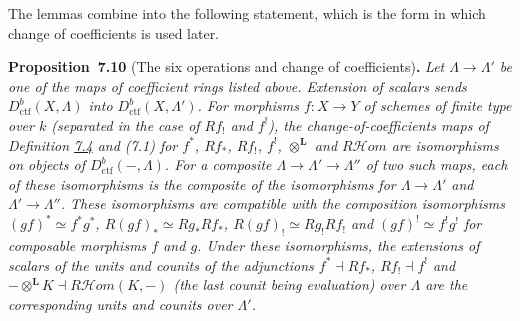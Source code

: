 \documentclass[11pt]{article}
\newenvironment{bpstatement}[2]{\par\addvspace{0.6\baselineskip}\noindent\textbf{#1}#2\textbf{.}\enspace\ignorespaces}
  {\par\addvspace{0.4\baselineskip}}
\newenvironment{bpstatementit}[2]{\begin{bpstatement}{#1}{#2}\itshape\ignorespaces}{\end{bpstatement}}
\providecommand{\cHom}{}\renewcommand{\cHom}{R\mathcal{H}\!om}
\begin{document}
\label{bp625}%
The lemmas combine into the following statement, which is the form in which change of coefficients is used later.

\label{bp626}%
\begin{bpstatementit}{Proposition~7.10}{ (The six operations and change of coefficients)}
Let \(\Lambda\to\Lambda'\) be one of the maps of coefficient rings listed above. Extension of scalars sends \(D^b_{\mathrm{ctf}}(X,\Lambda)\) into \(D^b_{\mathrm{ctf}}(X,\Lambda')\). For morphisms \(f:X\to Y\) of schemes of finite type over \(k\) (separated in the case of \(Rf_!\) and \(f^!\)), the change-of-coefficients maps of Definition \hyperref[bp612]{7.4} and (7.1) for \(f^*\), \(Rf_*\), \(Rf_!\), \(f^!\), \(\otimes^{\mathbf L}\) and \(\cHom\) are isomorphisms on objects of \(D^b_{\mathrm{ctf}}(-,\Lambda)\). For a composite \(\Lambda\to\Lambda'\to\Lambda''\) of two such maps, each of these isomorphisms is the composite of the isomorphisms for \(\Lambda\to\Lambda'\) and \(\Lambda'\to\Lambda''\). These isomorphisms are compatible with the composition isomorphisms \((gf)^*\simeq f^*g^*\), \(R(gf)_*\simeq Rg_*Rf_*\), \(R(gf)_!\simeq Rg_!Rf_!\) and \((gf)^!\simeq f^!g^!\) for composable morphisms \(f\) and \(g\). Under these isomorphisms, the extensions of scalars of the units and counits of the adjunctions \(f^*\dashv Rf_*\), \(Rf_!\dashv f^!\) and \(-\otimes^{\mathbf L}K\dashv\cHom(K,-)\) (the last counit being evaluation) over \(\Lambda\) are the corresponding units and counits over \(\Lambda'\).
\end{bpstatementit}
\end{document}
